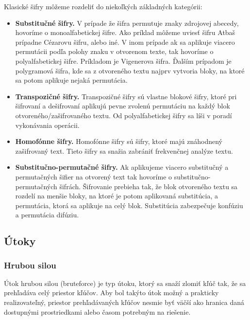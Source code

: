 Klasické šifry môžeme rozdeliť do niekoľkých základných kategórii:
\begin{itemize}

\item \textbf{Substitučné šifry.}
  V prípade že šifra permutuje znaky zdrojovej abecedy, hovoríme o monoalfabetickej šifre.
  Ako príklad môžeme uviesť šifru Atbaš prípadne Cézarovu šifru, alebo iné.
  V inom prípade ak sa aplikuje viacero permutácii podľa polohy znaku v otvorenom texte, tak hovoríme o polyalfabetickej šifre.
  Príkladom je Vigenerova šifra. Ďalším prípadom je polygramová šifra, kde sa z otvoreného textu najprv vytvoria bloky,
  na ktoré sa potom aplikuje nejaká permutácia.

\item \textbf{Transpozičné šifry.}
  Transpozičné šifry sú vlastne blokové šifry, ktoré pri šifrovaní a dešifrovaní aplikujú pevne zvolenú permutáciu na každý blok
  otvoreného/zašifrovaného textu. Od polyalfabetickej šifry sa líši v poradí vykonávania operácii.
  
\item \textbf{Homofónne šifry.}
  Homofónne šifry sú šifry, ktoré majú znáhodnený zašifrovaný text. Tieto šifry sa snažia zabrániť frekvenčnej analýze textu. 
  
\item \textbf{Substitučno-permutačné šifry.}
  Ak aplikujeme viacero substitučný a permutačných šifier na otvorený text tak hovoríme o substitučno-permutačných šifrách.
  Šifrovanie prebieha tak, že blok otvoreného textu sa rozdelí na menšie bloky, na ktoré je potom aplikovaná substitúcia, a permutácia,
  ktorá sa aplikuje na celý blok. Substitúcia zabezpečuje konfúziu a permutácia difúziu.
  
\end{itemize}

\subsection{Útoky}
\subsubsection{Hrubou silou}
Útok hrubou silou (bruteforce) je typ útoku, ktorý sa snaží zlomiť kľúč tak, že sa prehľadáva celý priestor kľúčov.
Aby bol takýto útok možný a prakticky realizovateľný, priestor prehľadávaných kľúčov nesmie byť väčší ako hranica daná dostupnými
prostriedkami alebo časom potrebným na riešenie.

